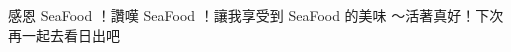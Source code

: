 \renewcommand{\acknowledgementname}{誌\hspace{2em}謝}
\clearpage
{}
\begin{acknowledgements}

感恩 SeaFood ！讚嘆 SeaFood ！讓我享受到 SeaFood 的美味 ～活著真好！下次再一起去看日出吧


\end{acknowledgements} 
